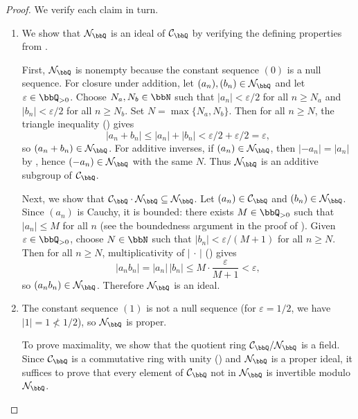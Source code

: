 \begin{proof}
    We verify each claim in turn.

    \begin{enumerate}
        \item We show that $\mathcal{N}_\bbQ$ is an ideal of $\mathcal{C}_\bbQ$ by verifying the defining properties from .

        First, $\mathcal{N}_\bbQ$ is nonempty because the constant sequence $(0)$ is a null sequence. For closure under addition, let $(a_n), (b_n) \in \mathcal{N}_\bbQ$ and let $\varepsilon \in \bbQ_{>0}$. Choose $N_a, N_b \in \bbN$ such that $|a_n| < \varepsilon/2$ for all $n \ge N_a$ and $|b_n| < \varepsilon/2$ for all $n \ge N_b$. Set $N = \max\{N_a, N_b\}$. Then for all $n \ge N$, the triangle inequality () gives
        $$|a_n + b_n| \le |a_n| + |b_n| < \varepsilon/2 + \varepsilon/2 = \varepsilon,$$
        so $(a_n + b_n) \in \mathcal{N}_\bbQ$. For additive inverses, if $(a_n) \in \mathcal{N}_\bbQ$, then $|{-a_n}| = |a_n|$ by , hence $(-a_n) \in \mathcal{N}_\bbQ$ with the same $N$. Thus $\mathcal{N}_\bbQ$ is an additive subgroup of $\mathcal{C}_\bbQ$.

        Next, we show that $\mathcal{C}_\bbQ \cdot \mathcal{N}_\bbQ \subseteq \mathcal{N}_\bbQ$. Let $(a_n) \in \mathcal{C}_\bbQ$ and $(b_n) \in \mathcal{N}_\bbQ$. Since $(a_n)$ is Cauchy, it is bounded: there exists $M \in \bbQ_{>0}$ such that $|a_n| \le M$ for all $n$ (see the boundedness argument in the proof of ). Given $\varepsilon \in \bbQ_{>0}$, choose $N \in \bbN$ such that $|b_n| < \varepsilon/(M+1)$ for all $n \ge N$. Then for all $n \ge N$, multiplicativity of $|\,\cdot\,|$ () gives
        $$|a_n b_n| = |a_n|\,|b_n| \le M\cdot\frac{\varepsilon}{M+1} < \varepsilon,$$
        so $(a_n b_n) \in \mathcal{N}_\bbQ$. Therefore $\mathcal{N}_\bbQ$ is an ideal.

        \item The constant sequence $(1)$ is not a null sequence (for $\varepsilon = 1/2$, we have $|1| = 1 \not< 1/2$), so $\mathcal{N}_\bbQ$ is proper.

        To prove maximality, we show that the quotient ring $\mathcal{C}_\bbQ / \mathcal{N}_\bbQ$ is a field. Since $\mathcal{C}_\bbQ$ is a commutative ring with unity () and $\mathcal{N}_\bbQ$ is a proper ideal, it suffices to prove that every element of $\mathcal{C}_\bbQ$ not in $\mathcal{N}_\bbQ$ is invertible modulo $\mathcal{N}_\bbQ$.


\end{enumerate}
\end{proof}

